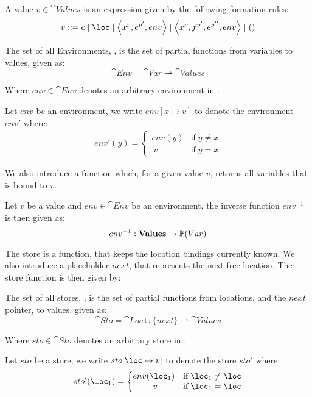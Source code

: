 \documentclass[../../master.tex]{subfiles}
\begin{document}
A value $v\in\cat{Values}$ is an expression given by the following formation rules:
$$v::=c\mid\loc\mid\left\langle x^{p},e^{p'},env\right\rangle\mid\left\langle x^{p},f^{p'},e^{p''},env\right\rangle\mid ()$$

\begin{definition}[]
	The set of all Environments, , is the set of partial functions from variables to values, given as:
	$$\cat{Env}=\cat{Var}\rightharpoonup\cat{Values}$$
\end{definition}
Where $env\in\cat{Env}$ denotes an arbitrary environment in .

\begin{definition}
	Let $env$ be an environment, we write $env[x\mapsto v]$ to denote the environment $env'$ where:
	\begin{align*}
		env'(y)=
		\left\{\begin{matrix}
			env(y) & \mbox{if}\;y\neq x\\\	 
			v & \mbox{if}\;y=x
		\end{matrix}\right.
	\end{align*}
\end{definition}

We also introduce a function which, for a given value $v$, returns all variables that is bound to $v$.
\begin{definition}
	Let $v$ be a value and $env\in\cat{Env}$ be an environment, the inverse function $env^{-1}$ is then given as:
$$env^{-1}:\textbf{Values}\rightarrow\mathbb{P}(Var)$$
\end{definition}

The store is a function, that keeps the location bindings currently known.
We also introduce a placeholder $next$, that represents the next free location.
The store function is then given by:

\begin{definition}[]
	The set of all stores, , is the set of partial functions from locations, and the $next$ pointer, to values, given as:
	$$\cat{Sto}=\cat{Loc}\cup\{next\}\rightharpoonup\cat{Values}$$
\end{definition}
Where $sto\in{}$ denotes an arbitrary store in \cat{Sto}.

\begin{definition}
	Let $sto$ be a store, we write $sto[\loc\mapsto v]$ to denote the store $sto'$ where:
	\begin{align*}
		sto'(\loc_1)=
		\left\{\begin{matrix}
			env(\loc_1) & \mbox{if}\;\loc_1\neq \loc\\\	 
			v & \mbox{if}\;\loc_1=\loc
		\end{matrix}\right.
	\end{align*}
\end{definition}
\end{document}
